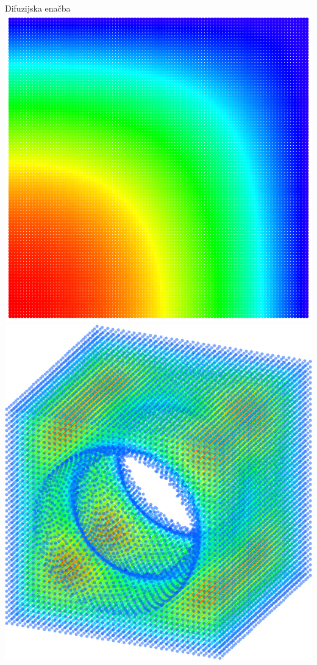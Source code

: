 \begin{frame}{Difuzijska enačba}
  \mbox{ }
  \hfill
  \includegraphics[height=0.4\textheight]{resources/neu.png}
  \hspace{10pt}
  \includegraphics[height=0.4\textheight]{resources/poisson_weird3.png}
  \hfill
  \mbox{ }
\end{frame}

